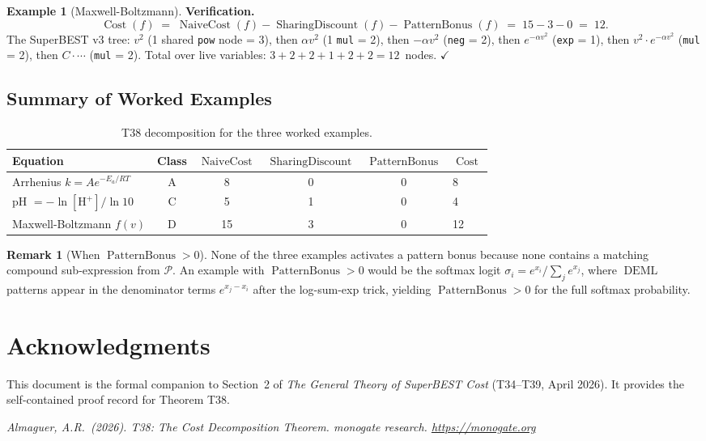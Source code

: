 \documentclass[12pt,a4paper]{article}
\theoremstyle{definition}
\newtheorem{remark}[theorem]{Remark}
\newtheorem{example}[theorem]{Example}
\newcommand{\DEML}{\operatorname{DEML}}
\newcommand{\Cost}{\operatorname{Cost}}
\newcommand{\NC}{\operatorname{NaiveCost}}
\newcommand{\SD}{\operatorname{SharingDiscount}}
\newcommand{\PB}{\operatorname{PatternBonus}}
\begin{document}
\begin{example}[Maxwell-Boltzmann]
\textbf{Verification.}
\[
  \Cost(f) \;=\; \NC(f) - \SD(f) - \PB(f)
           \;=\; 15 - 3 - 0 \;=\; 12.
\]
The SuperBEST v3 tree: $v^2$ (1 shared \texttt{pow} node = 3), then
$\alpha v^2$ (1 \texttt{mul} = 2), then $-\alpha v^2$ (\texttt{neg} = 2),
then $e^{-\alpha v^2}$ (\texttt{exp} = 1), then $v^2 \cdot e^{-\alpha v^2}$
(\texttt{mul} = 2), then $C \cdot \cdots$ (\texttt{mul} = 2).
Total over live variables: $3 + 2 + 2 + 1 + 2 + 2 = 12$~nodes.
\hfill$\checkmark$
\end{example}

\subsection{Summary of Worked Examples}

\begin{table}[h]
\centering
\caption{T38 decomposition for the three worked examples.}
\label{tab:examples}
\smallskip
\begin{tabular}{@{}lccccl@{}}
\toprule
\textbf{Equation} & \textbf{Class} & $\NC$ & $\SD$ & $\PB$ & $\Cost$ \\
\midrule
Arrhenius $k = Ae^{-E_a/RT}$       & A & 8  & 0 & 0 & 8  \\
pH $= -\ln[\mathrm{H}^+]/\ln 10$   & C & 5  & 1 & 0 & 4  \\
Maxwell-Boltzmann $f(v)$            & D & 15 & 3 & 0 & 12 \\
\bottomrule
\end{tabular}
\end{table}

\begin{remark}[When $\PB > 0$]
None of the three examples activates a pattern bonus because none contains a
matching compound sub-expression from $\mathcal{P}$.  An example with
$\PB > 0$ would be the softmax logit
$\sigma_i = e^{x_i} / \sum_j e^{x_j}$, where $\DEML$ patterns appear in the
denominator terms $e^{x_j - x_i}$ after the log-sum-exp trick, yielding
$\PB > 0$ for the full softmax probability.
\end{remark}

\section*{Acknowledgments}

This document is the formal companion to Section~2 of \emph{The General Theory
of SuperBEST Cost} (T34--T39, April 2026).  It provides the self-contained
proof record for Theorem T38.

\bigskip
\noindent\textit{Almaguer, A.R.\ (2026).
T38: The Cost Decomposition Theorem.
monogate research. \url{https://monogate.org}}
\end{document}
